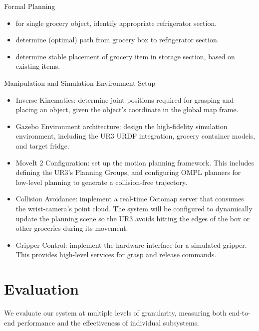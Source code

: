 \documentclass{article}
\begin{document}
Formal Planning
\begin{itemize}
    \item for single grocery object, identify appropriate refrigerator section.
    \item determine (optimal) path from grocery box to refrigerator section.
    \item determine stable placement of grocery item in storage section, based on existing items.
\end{itemize}

Manipulation and Simulation Environment Setup
\begin{itemize}
    \item Inverse Kinematics: determine joint positions required for grasping and placing an object, given the object's coordinate in the global map frame.
    \item Gazebo Environment architecture: design the high-fidelity simulation environment, including the UR3 URDF integration, grocery container models, and target fridge.
    \item MoveIt 2 Configuration: set up the motion planning framework. This includes defining the UR3’s Planning Groups, and configuring OMPL planners for low-level planning to generate a collision-free trajectory. 
    \item Collision Avoidance: implement a real-time Octomap server that consumes the wrist-camera’s point cloud. The system will be configured to dynamically update the planning scene so the UR3 avoids hitting the edges of the box or other groceries during its movement.
    \item Gripper Control: implement the hardware interface for a simulated gripper. This provides high-level services for grasp and release commands.
\end{itemize}



\section{Evaluation}

We evaluate our system at multiple levels of granularity, measuring both end-to-end performance and the effectiveness of individual subsystems.
\end{document}
